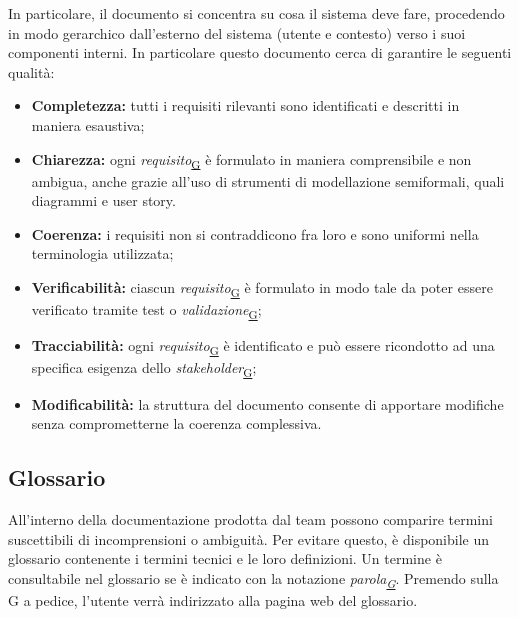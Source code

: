﻿\documentclass[a4paper,12pt]{article}
\begin{document}
{{      In particolare, il documento si concentra su cosa il sistema deve fare, procedendo in modo gerarchico dall'esterno del sistema (utente e contesto) verso i suoi componenti interni.
      \newline
      In particolare questo documento cerca di garantire le seguenti qualità:
      \begin{itemize}
          \item \textbf{Completezza:} tutti i requisiti rilevanti sono identificati e descritti in maniera esaustiva;
          \item \textbf{Chiarezza:} ogni \textit{requisito}\textsubscript{\href{https://atlasteam9.github.io/Atlas/glossario.html\#Requisito}{G}} è formulato in maniera comprensibile e non ambigua, anche grazie all'uso di strumenti di modellazione semiformali,
                quali diagrammi e user story.
          \item \textbf{Coerenza:} i requisiti non si contraddicono fra loro e sono uniformi nella terminologia utilizzata;
          \item \textbf{Verificabilità:} ciascun \textit{requisito}\textsubscript{\href{https://atlasteam9.github.io/Atlas/glossario.html\#Requisito}{G}} è formulato in modo tale da poter essere verificato tramite test o \textit{validazione}\textsubscript{\href{https://atlasteam9.github.io/Atlas/glossario.html\#Validazione}{G}};
          \item \textbf{Tracciabilità:} ogni \textit{requisito}\textsubscript{\href{https://atlasteam9.github.io/Atlas/glossario.html\#Requisito}{G}} è identificato e può essere ricondotto ad una specifica esigenza dello \textit{stakeholder}\textsubscript{\href{https://atlasteam9.github.io/Atlas/glossario.html\#Stakeholder}{G}};
          \item \textbf{Modificabilità:} la struttura del documento consente di apportare modifiche senza comprometterne la coerenza complessiva.
      \end{itemize}
  }

  \subsection{Glossario}{
      All'interno della documentazione prodotta dal team possono comparire termini suscettibili di incomprensioni o ambiguità. Per evitare questo, è disponibile un glossario
      contenente i termini tecnici e le loro definizioni. Un termine è consultabile nel glossario se è indicato con la notazione \textit{parola\textsubscript{\href{https://atlasteam9.github.io/Atlas/glossario.html}{G}}}.
      Premendo sulla G a pedice, l'utente verrà indirizzato alla pagina web del glossario.
  }

}
\end{document}
